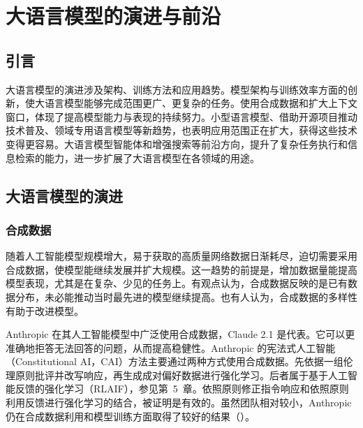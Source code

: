 \chapter{大语言模型的演进与前沿}
\label{ch:frontiers}

\section{引言}
大语言模型的演进涉及架构、训练方法和应用趋势。模型架构与训练效率方面的创新，使大语言模型能够完成范围更广、更复杂的任务。使用合成数据和扩大上下文窗口，体现了提高模型能力与表现的持续努力。小型语言模型、借助开源项目推动技术普及、领域专用语言模型等新趋势，也表明应用范围正在扩大，获得这些技术变得更容易。大语言模型智能体和增强搜索等前沿方向，提升了复杂任务执行和信息检索的能力，进一步扩展了大语言模型在各领域的用途。

\section{大语言模型的演进}
\label{sec:ch10-evolution}

\subsection{合成数据}
\label{sec:ch10-synthetic-data}
随着人工智能模型规模增大，易于获取的高质量网络数据日渐耗尽，迫切需要采用合成数据，使模型能继续发展并扩大规模。这一趋势的前提是，增加数据量能提高模型表现，尤其是在复杂、少见的任务上。有观点认为，合成数据反映的是已有数据分布，未必能推动当时最先进的模型继续提高。也有人认为，合成数据的多样性有助于改进模型。

Anthropic 在其人工智能模型中广泛使用合成数据，Claude 2.1 是代表。它可以更准确地拒答无法回答的问题，从而提高稳健性。Anthropic 的宪法式人工智能（Constitutional AI，CAI）方法主要通过两种方式使用合成数据。先依据一组伦理原则批评并改写响应，再生成成对偏好数据进行强化学习。后者属于基于人工智能反馈的强化学习（RLAIF），参见第~5~章。依照原则修正指令响应和依照原则利用反馈进行强化学习的结合，被证明是有效的。虽然团队相对较小，Anthropic 仍在合成数据利用和模型训练方面取得了较好的结果（）。

